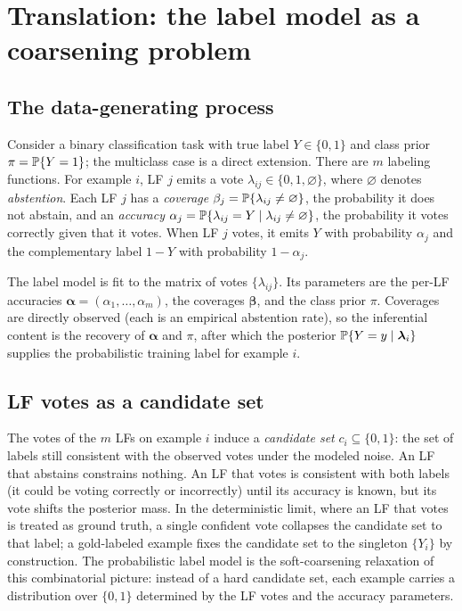 \section{Translation: the label model as a coarsening problem}
\label{sec:translation}

\subsection{The data-generating process}

Consider a binary classification task with true label $Y \in \{0,1\}$
and class prior $\pi = \mathbb{P}\{Y = 1\}$; the multiclass case is a
direct extension. There are $m$ labeling functions. For example $i$,
LF $j$ emits a vote $\lambda_{ij} \in \{0, 1, \varnothing\}$, where
$\varnothing$ denotes \emph{abstention}. Each LF $j$ has a
\emph{coverage} $\beta_j = \mathbb{P}\{\lambda_{ij} \neq \varnothing\}$,
the probability it does not abstain, and an \emph{accuracy}
$\alpha_j = \mathbb{P}\{\lambda_{ij} = Y \mid \lambda_{ij} \neq
\varnothing\}$, the probability it votes correctly given that it
votes. When LF $j$ votes, it emits $Y$ with probability $\alpha_j$
and the complementary label $1 - Y$ with probability $1 - \alpha_j$.

The label model is fit to the matrix of votes $\{\lambda_{ij}\}$. Its
parameters are the per-LF accuracies $\bm{\alpha} = (\alpha_1, \ldots,
\alpha_m)$, the coverages $\bm{\beta}$, and the class prior $\pi$.
Coverages are directly observed (each is an empirical abstention
rate), so the inferential content is the recovery of $\bm{\alpha}$
and $\pi$, after which the posterior $\mathbb{P}\{Y = y \mid
\bm{\lambda}_i\}$ supplies the probabilistic training label for
example $i$.

\subsection{LF votes as a candidate set}

The votes of the $m$ LFs on example $i$ induce a \emph{candidate set}
$c_i \subseteq \{0, 1\}$: the set of labels still consistent with the
observed votes under the modeled noise. An LF that abstains
constrains nothing. An LF that votes is consistent with both labels
(it could be voting correctly or incorrectly) until its accuracy is
known, but its vote shifts the posterior mass. In the deterministic
limit, where an LF that votes is treated as ground truth, a single
confident vote collapses the candidate set to that label; a
gold-labeled example fixes the candidate set to the singleton
$\{Y_i\}$ by construction. The probabilistic label model is the
soft-coarsening relaxation of this combinatorial picture: instead of
a hard candidate set, each example carries a distribution over
$\{0,1\}$ determined by the LF votes and the accuracy parameters.

